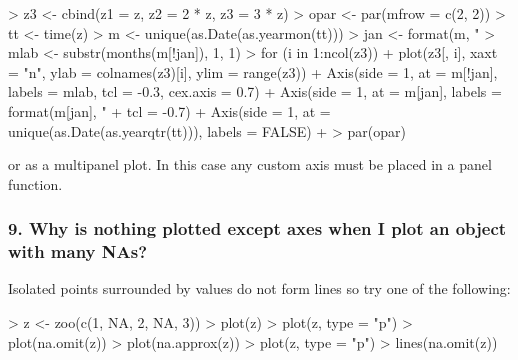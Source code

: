 \documentclass[article,nojss]{jss}
\newcommand{\mysection}[1]{\subsubsection[#1]{\textbf{#1}}}
\begin{document}
\begin{Schunk}
\begin{Sinput}
> z3 <- cbind(z1 = z, z2 = 2 * z, z3 = 3 * z)
> opar <- par(mfrow = c(2, 2))
> tt <- time(z)
> m <- unique(as.Date(as.yearmon(tt)))
> jan <- format(m, "%
> mlab <- substr(months(m[!jan]), 1, 1)
> for (i in 1:ncol(z3)) {
+     plot(z3[, i], xaxt = "n", ylab = colnames(z3)[i], ylim = range(z3))
+     Axis(side = 1, at = m[!jan], labels = mlab, tcl = -0.3, cex.axis = 0.7)
+     Axis(side = 1, at = m[jan], labels = format(m[jan], "%
+         tcl = -0.7)
+     Axis(side = 1, at = unique(as.Date(as.yearqtr(tt))), labels = FALSE)
+ }
> par(opar)
\end{Sinput}
\end{Schunk}

or as a multipanel plot.  In this case any custom axis must be
placed in a panel function.

\begin{Schunk}
\end{Schunk}

\mysection{9.  Why is nothing plotted except axes when I plot an 
object with many NAs?}

Isolated points surrounded by  values do not form lines 
so try one of the following:

\begin{Schunk}
\begin{Sinput}
> z <- zoo(c(1, NA, 2, NA, 3))
> plot(z)
> plot(z, type = "p")
> plot(na.omit(z))
> plot(na.approx(z))
> plot(z, type = "p")
> lines(na.omit(z))
\end{Sinput}
\end{Schunk}
\end{document}
